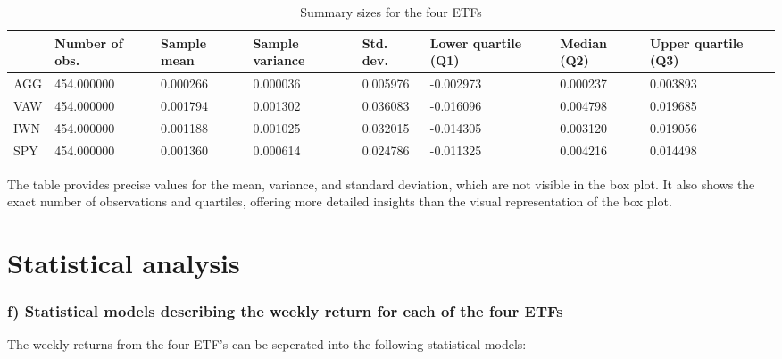 \documentclass{rapport}
\begin{document}
\begin{table}[H]  %
    \centering  %
    \begin{tabularx}{\textwidth}{lXXXXXXX}
    \toprule
         & Number of obs. & Sample mean & Sample variance & Std. dev. & Lower quartile (Q1) & Median (Q2) & Upper quartile (Q3) \\
    \midrule
        AGG & 454.000000 & 0.000266 & 0.000036 & 0.005976 & -0.002973 & 0.000237 & 0.003893 \\
        VAW & 454.000000 & 0.001794 & 0.001302 & 0.036083 & -0.016096 & 0.004798 & 0.019685 \\
        IWN & 454.000000 & 0.001188 & 0.001025 & 0.032015 & -0.014305 & 0.003120 & 0.019056 \\
        SPY & 454.000000 & 0.001360 & 0.000614 & 0.024786 & -0.011325 & 0.004216 & 0.014498 \\
    \bottomrule
    \end{tabularx}
    \caption{Summary sizes for the four ETFs}  %
\end{table}




The table provides precise values for the mean, variance, and standard deviation, which are not visible in the box plot. 
It also shows the exact number of observations and quartiles, offering more detailed insights than the visual representation of the box plot.





\pagebreak
\section{Statistical analysis}
\subsubsection*{\textbf{f)} Statistical models describing the weekly return for each of the
four ETFs}

The weekly returns from the four ETF's can be seperated into the following statistical models:
\end{document}
